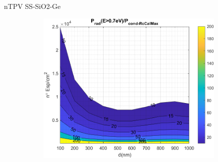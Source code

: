 \documentclass[spanish,a4paper]{beamer}%
\begin{document}
\begin{frame}{nTPV SS-SiO2-Ge}
{\begin{figure}[h]
\begin{subfigure}[b]{0.48\textwidth}
				\end{subfigure}\hfill
				\begin{subfigure}[b]{0.48\textwidth}\centering
					\includegraphics[width=.8\textwidth]{SS_Rc}%
				\end{subfigure}
			\label{SsSiO2Ge_rel}%
			\end{figure}	
		}
	\end{frame}
	
\end{document}

